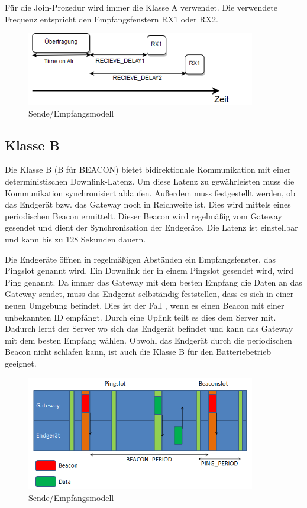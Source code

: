 \documentclass[a4paper, 12pt]{article}
\begin{document}
            Für die Join-Prozedur wird immer die Klasse A verwendet. Die verwendete Frequenz entspricht den 
            Empfangsfenstern RX1 oder RX2.

            \begin{figure}[ht]
                \centering
                \includegraphics[width=10cm]{KlasseA}
                \caption{Sende/Empfangsmodell}
            \end{figure}
 
        \subsection{Klasse B}
            Die Klasse B (B für BEACON) bietet bidirektionale Kommunikation mit einer deterministischen Downlink-Latenz.
            Um diese Latenz zu gewährleisten muss die Kommunikation synchronisiert ablaufen. Außerdem muss 
            festgestellt werden, ob das Endgerät bzw. das Gateway noch in Reichweite ist. Dies wird mittels eines 
            periodischen Beacon ermittelt. Dieser Beacon wird regelmäßig vom Gateway gesendet und dient der 
            Synchronisation der Endgeräte. Die Latenz ist einstellbar und kann 
            bis zu 128 Sekunden dauern.\cite[S.66 ff.]{LoRaSpec}

            Die Endgeräte öffnen in regelmäßigen Abständen ein Empfangsfenster, das Pingslot genannt wird. Ein Downlink 
            der in einem Pingslot gesendet wird, wird Ping genannt. Da immer das Gateway mit dem besten Empfang die 
            Daten an das Gateway sendet, muss das Endgerät selbständig feststellen, dass es sich in einer neuen Umgebung befindet.
            Dies ist der Fall , wenn es einen Beacon mit einer unbekannten ID empfängt. Durch eine Uplink teilt es dies 
            dem Server mit. 
            Dadurch lernt der Server wo sich das Endgerät befindet und kann das Gateway mit dem besten Empfang wählen.
            Obwohl das Endgerät durch die periodischen Beacon nicht schlafen kann, ist auch die Klasse B für den 
            Batteriebetrieb geeignet.

            
            \begin{figure}[ht]
                \centering
                \includegraphics[width=10cm]{KlasseB}
                \caption{Sende/Empfangsmodell}
            \end{figure}
\end{document}
